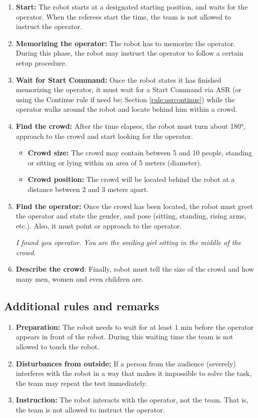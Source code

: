\begin{enumerate}

\item \textbf{Start:} The robot starts at a designated starting position, and waits for the  operator. When the referees start the time, the team is not allowed to instruct the operator.
\item \textbf{Memorizing the operator:} The robot has to memorize the operator. During this phase, the robot may instruct the operator to follow a certain setup procedure.
\item \textbf{Wait for Start Command:} Once the robot states it has finished memorizing the operator, it must wait for a Start Command via ASR (or using the Continue rule if need be; Section \ref{rule:asrcontinue}) while the operator walks around the robot and locate behind him within a crowd.
\item \textbf{Find the crowd:} After the time elapses, the robot must turn about 180°, approach to the crowd and start looking for the operator.
\begin{itemize}
\item \textbf{Crowd size:} The crowd may contain between 5 and 10 people, standing or sitting or lying within an  area of 5 meters (diameter).
\item \textbf{Crowd position:} The crowd will be located behind the robot at a distance between 2 and 3 meters apart.
\end{itemize}
\item \textbf{Find the operator:} Once the crowd has been located, the robot must greet the operator and state the gender, and pose (sitting, standing, rising arms, etc.). Also, it must point or approach to the operator.

\textit{I found you operator. You are the smiling girl sitting in the middle of the crowd.}

\item \textbf{Describe the crowd}: Finally, robot must tell the size of the crowd and how many men, women and even children are.
\end{enumerate}

\subsection{Additional rules and remarks}
\begin{enumerate}
\item \textbf{Preparation:} The robot needs to wait for at least 1 min before the operator appears in front of the robot. During this waiting time the team is not allowed to touch the robot.
\item \textbf{Disturbances from outside:} If a person from the audience (severely) interferes with the robot in a way that makes it impossible to solve the task, the team may repeat the test immediately.
\item \textbf{Instruction:} The robot interacts with the operator, not the team. That is, the team is not allowed to instruct the operator.
\end{enumerate}


